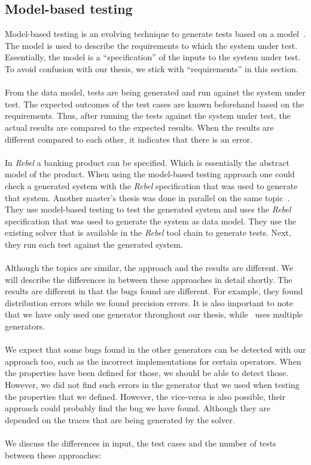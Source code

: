 \subsection{Model-based testing}
Model-based testing is an evolving technique to generate tests based on a model~\cite{dalal1999model}. The model is used to describe the requirements to which the system under test. Essentially, the model is a ``specification'' of the inputs to the system under test. To avoid confusion with our thesis, we stick with ``requirements'' in this section.\\
\\
From the data model, tests are being generated and run against the system under test. The expected outcomes of the test cases are known beforehand based on the requirements. Thus, after running the tests against the system under test, the actual results are compared to the expected results. When the results are different compared to each other, it indicates that there is an error.\\
\\
In \textit{Rebel} a banking product can be specified. Which is essentially the abstract model of the product. When using the model-based testing approach one could check a generated system with the \textit{Rebel} specification that was used to generate that system. Another master's thesis was done in parallel on the same topic~\cite{tharumarajah2017runtime}. They use model-based testing to test the generated system and uses the \textit{Rebel} specification that was used to generate the system as data model. They use the existing solver that is available in the \textit{Rebel} tool chain to generate tests. Next, they run each test against the generated system.\\
\\
Although the topics are similar, the approach and the results are different. We will describe the differences in between these approaches in detail shortly. The results are different in that the bugs found are different. For example, they found distribution errors while we found precision errors. It is also important to note that we have only used one generator throughout our thesis, while~\cite{tharumarajah2017runtime} uses multiple generators.\\
\\
We expect that some bugs found in the other generators can be detected with our approach too, such as the incorrect implementations for certain operators. When the properties have been defined for those, we should be able to detect those. However, we did not find such errors in the generator that we used when testing the properties that we defined. However, the vice-versa is also possible, their approach could probably find the bug we have found. Although they are depended on the traces that are being generated by the solver.\\
\\
We discuss the differences in input, the test cases and the number of tests between these approaches:
